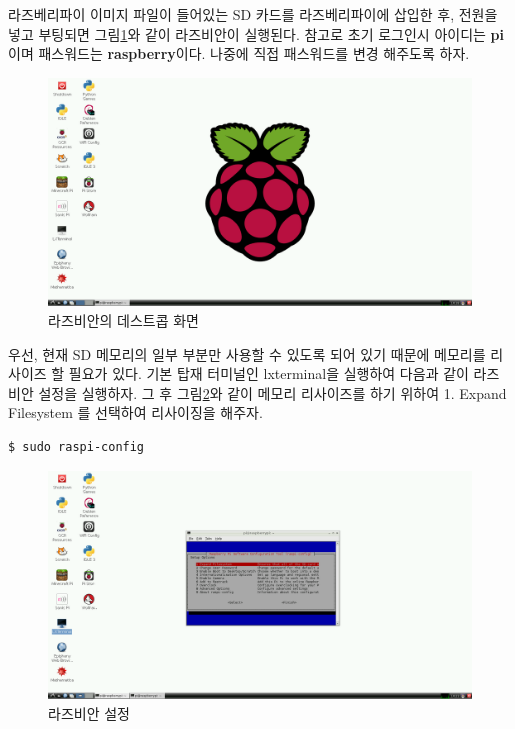 \vspace{\baselineskip}
라즈베리파이 이미지 파일이 들어있는 SD 카드를 라즈베리파이에 삽입한 후, 전원을 넣고 부팅되면 그림\ref{fig:raspberrypi_raspbian_on}와 같이 라즈비안이 실행된다. 참고로 초기 로그인시 아이디는 \textbf{pi} 이며 패스워드는 \textbf{raspberry}이다. 나중에 직접 패스워드를 변경 해주도록 하자.

\begin{figure}[h]
\centering\includegraphics[width=0.9\columnwidth]{pictures/chapter3/raspberrypi_raspbian_desktop.png}
\caption{라즈비안의 데스트콥 화면}
\label{fig:raspberrypi_raspbian_on}
\end{figure}

우선, 현재 SD 메모리의 일부 부분만 사용할 수 있도록 되어 있기 때문에 메모리를 리사이즈 할 필요가 있다. 기본 탑재 터미널인 lxterminal을 실행하여 다음과 같이 라즈비안 설정을 실행하자. 그 후 그림\ref{fig:raspberrypi_expand_filesystem1}와 같이 메모리 리사이즈를 하기 위하여 1. Expand Filesystem 를 선택하여 리사이징을 해주자.

\vspace{\baselineskip}
\begin{lstlisting}[language=ROS]
$ sudo raspi-config
\end{lstlisting}

\begin{figure}[h]
\centering\includegraphics[width=0.7\columnwidth]{pictures/chapter3/raspberrypi_expand_filesystem1.png}
\caption{라즈비안 설정}
\label{fig:raspberrypi_expand_filesystem1}
\end{figure}

